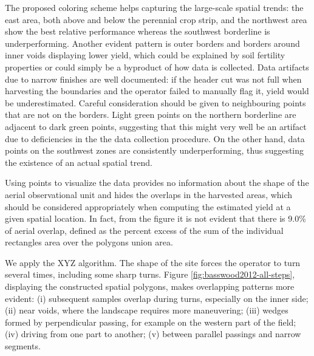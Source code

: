  The proposed coloring scheme helps
capturing the large-scale spatial trends: the east area, both above
and below the perennial crop strip, and the northwest area show the
best relative performance whereas the southwest borderline is
underperforming. Another evident pattern is outer borders and borders
around inner voids displaying lower yield, which could be explained by
soil fertility properties or could simply be a byproduct of how data
is collected. Data artifacts due to narrow finishes are well
documented: if the header cut was not full when harvesting the
boundaries and the operator failed to manually flag it, yield would be
underestimated. Careful consideration should be given to neighbouring
points that are not on the borders. Light green points on the northern
borderline are adjacent to dark green points, suggesting that this
might very well be an artifact due to deficiencies in the the data
collection procedure. On the other hand, data points on the southwest
zones are consistently underperforming, thus suggesting the existence
of an actual spatial trend.

 Using points to visualize the data
provides no information about the shape of the aerial observational
unit and hides the overlaps in the harvested areas, which should be
considered appropriately when computing the estimated yield at a given
spatial location. In fact, from the figure it is not evident that
there is 9.0\% of aerial overlap, defined as the percent excess of the
sum of the individual rectangles area over the polygons union area.

 We apply the XYZ algorithm. The
shape of the site forces the operator to turn several times, including
some sharp turns. Figure \ref{fig:basswood2012-all-steps}, displaying
the constructed spatial polygons, makes overlapping patterns more
evident: (i) subsequent samples overlap during turns, especially on
the inner side; (ii) near voids, where the landscape requires more
maneuvering; (iii) wedges formed by perpendicular passing, for example
on the western part of the field; (iv) driving from one part to
another; (v) between parallel passings and narrow segments.

